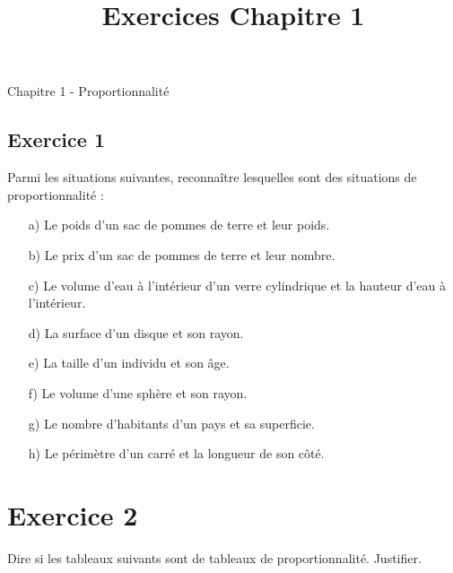 \documentclass[12 pt]{extarticle}
\title{Exercices Chapitre 1}
\date{}
\theoremstyle{plain}
\begin{document}
\begin{center}{\Large Chapitre 1 - Proportionnalité}\\
 \end{center} 

\subsection*{Exercice 1}

Parmi les situations suivantes, reconnaître lesquelles sont des situations de proportionnalité : \begin{itemize}
\item[a)] Le poids d'un sac de pommes de terre et leur poids.
\item[b)] Le prix d'un sac de pommes de terre et leur nombre.
\item[c)] Le volume d'eau à l'intérieur d'un verre cylindrique 
et la hauteur d'eau à l'intérieur. 
\item[d)] La surface d'un disque et son rayon.
\item[e)] La taille d'un individu et son âge.
\item[f)] Le volume d'une sphère et son rayon.
\item[g)] Le nombre d'habitants d'un pays et sa superficie. 
\item[h)] Le périmètre d'un carré et la longueur de son côté. 
\end{itemize}



\section*{Exercice 2}
{Dire si les tableaux suivants sont de tableaux de proportionnalité. Justifier.}
\end{document}
